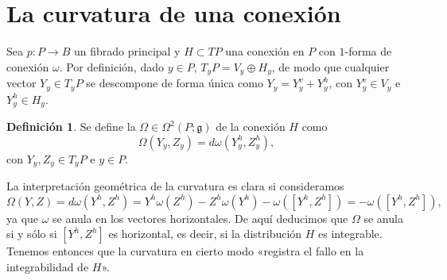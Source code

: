 \documentclass[12pt,a4paper]{article}
\theoremstyle{definition} \newtheorem{defn}[thm]{Definición}
\theoremstyle{definition} \newtheorem{ejemplo}[thm]{Ejemplo}
\theoremstyle{definition} \newtheorem{ejercicio}[thm]{Ejercicio}
\theoremstyle{remark} \newtheorem*{obs}{Observación}
\def\gg{\mathfrak{g}}
\let\emph\relax
\begin{document}
	\section{La curvatura de una conexión}
	Sea $p:P\rightarrow B$ un fibrado principal y $H\subset TP$ una conexión en $P$ con $1$-forma de conexión $\omega$. Por definición, dado $y\in P$, $T_yP=V_y\oplus H_y$, de modo que cualquier vector $Y_y \in T_yP$ se descompone de forma única como $Y_y=Y_y^v+Y_y^h$, con $Y_y^v\in V_y$ e $Y_y^h\in H_y$.  
	\begin{defn}
	  Se define la \emph{curvatura} $\Omega \in \Omega^2(P;\gg)$ de la conexión $H$ como 
	  \begin{equation*}
	    \Omega(Y_y,Z_y)=d\omega(Y_y^h,Z_y^h),
	  \end{equation*}
	  con $Y_y, Z_y \in T_y P$ e $y\in P$.
	\end{defn}

	La interpretación geométrica de la curvatura es clara si consideramos
	\begin{equation*}
	  \Omega(Y,Z)=d\omega(Y^h,Z^h)=Y^h\omega(Z^h)-Z^h\omega(Y^h)-\omega([Y^h,Z^h])=-\omega([Y^h,Z^h]),
	\end{equation*}
	ya que $\omega$ se anula en los vectores horizontales. De aquí deducimos que $\Omega$ se anula si y sólo si $[Y^h,Z^h]$ es horizontal, es decir, si la distribución $H$ es integrable. Tenemos entonces que la curvatura en cierto modo «registra el fallo en la integrabilidad de $H$».
	      
\end{document}
